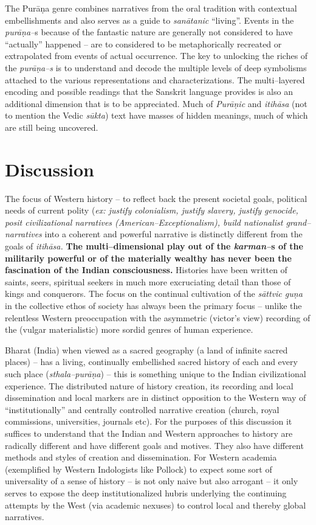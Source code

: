 The Purāṇa genre combines narratives from the oral tradition with contextual embellishments and also serves as a guide to \textit{sanātanic} “living”. Events in the \textit{purāṇa–}s because of the fantastic nature are generally not considered to have “actually” happened – are to considered to be metaphorically recreated or extrapolated from events of actual occurrence. The key to unlocking the riches of the \textit{purāṇa–s} is to understand and decode the multiple levels of deep symbolisms attached to the various representations and characterizations. The multi–layered encoding and possible readings that the Sanskrit language provides is also an additional dimension that is to be appreciated. Much of \textit{Purāṇic} and \textit{itihāsa} (not to mention the Vedic \textit{sūkta}) text have masses of hidden meanings, much of which are still being uncovered.


\section*{Discussion}

The focus of Western history – to reflect back the present societal goals, political needs of current polity (\textit{ex: justify colonialism, justify slavery, justify genocide, posit civilizational narratives (American–Exceptionalism), build nationalist grand–narratives} into a coherent and powerful narrative is distinctly different from the goals of \textit{itihāsa.} \textbf{The multi–dimensional play out of the \textit{karman–}s of the militarily powerful or of the materially wealthy has never been the fascination of the Indian consciousness.} Histories have been written of saints, seers, spiritual seekers in much more excruciating detail than those of kings and conquerors. The focus on the continual cultivation of the \textit{sāttvic guṇa} in the collective ethos of society has always been the primary focus – unlike the relentless Western preoccupation with the asymmetric (victor’s view) recording of the (vulgar materialistic) more sordid genres of human experience.

Bharat (India) when viewed as a sacred geography (a land of infinite sacred places) – has a living, continually embellished sacred history of each and every such place (\textit{sthala–purāṇa}) – this is something unique to the Indian civilizational experience. The distributed nature of history creation, its recording and local dissemination and local markers are in distinct opposition to the Western way of “institutionally” and centrally controlled narrative creation (church, royal commissions, universities, journals etc). For the purposes of this discussion it suffices to understand that the Indian and Western approaches to history are radically different and have different goals and motives. They also have different methods and styles of creation and dissemination. For Western academia (exemplified by Western Indologists like Pollock) to expect some sort of universality of a sense of history – is not only naive but also arrogant – it only serves to expose the deep institutionalized hubris underlying the continuing attempts by the West (via academic nexuses) to control local and thereby global narratives.


